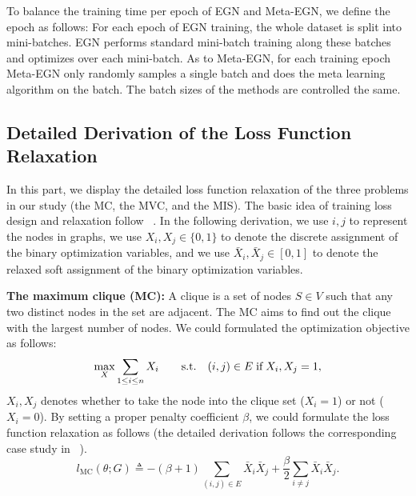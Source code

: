 To balance the training time per epoch of EGN and Meta-EGN, we define the epoch as follows: For each epoch of EGN training, the whole dataset is split into mini-batches. EGN performs standard mini-batch training along these batches and optimizes over each mini-batch. As to Meta-EGN, for each training epoch Meta-EGN only randomly samples a single batch and does the meta learning algorithm on the batch. The batch sizes of the methods are controlled the same.

\subsection{Detailed Derivation of the Loss Function Relaxation}
In this part, we display the detailed loss function relaxation of the three problems in our study (the MC, the MVC, and the MIS). The basic idea of training loss design and relaxation follow ~\citep{karalias2020erdos,wang2022unsupervised}.
In the following derivation, we use $i,j$ to represent the nodes in graphs, we use $X_i, X_j \in \{0,1\}$ to denote the discrete assignment of the binary optimization variables, and we use $\bar{X}_i, \bar{X}_j \in [0,1]$ to denote the relaxed soft assignment of the binary optimization variables.

\textbf{The maximum clique (MC):} A clique is a set of nodes $S\in V$ such that any two distinct nodes in the set are adjacent. The MC aims to find out the clique with the largest number of nodes. We could formulated the optimization objective as follows:
\begin{equation}
\centering
    \max_{X}  \sum_{1\leq i\leq n} X_i  \quad \quad \text{s.t.} \quad  (i, j) \in E\;\text{if}\;{X_i, X_j = 1} ,
\end{equation}$X_i,X_j$ denotes whether to take the node into the clique set ($X_i = 1$) or not ($X_i = 0$). By setting a proper penalty coefficient $\beta$, we could formulate the loss function relaxation as follows (the detailed derivation follows the corresponding case study in ~\cite{karalias2020erdos}).
\begin{equation}
    l_{\text{MC}}(\theta;G) \triangleq - (\beta+1)\sum_{(i,j)\in E} \bar{X}_i \bar{X}_j + \frac{\beta}{2} \sum_{i \neq j} \bar{X}_i \bar{X}_j.
\end{equation}

